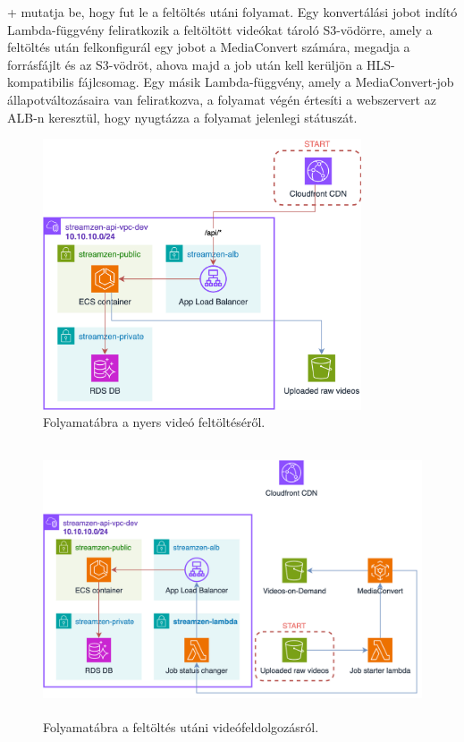 \Az+ mutatja be, hogy fut le a feltöltés utáni folyamat. Egy konvertálási jobot indító Lambda-függvény feliratkozik a feltöltött videókat tároló S3-vödörre, amely a feltöltés után felkonfigurál egy jobot a MediaConvert számára, megadja a forrásfájlt és az S3-vödröt, ahova majd a job után kell kerüljön a HLS-kompatibilis fájlcsomag. Egy másik Lambda-függvény, amely a MediaConvert-job állapotváltozásaira van feliratkozva, a folyamat végén értesíti a webszervert az ALB-n keresztül, hogy nyugtázza a folyamat jelenlegi státuszát.

\begin{figure}[h]
	\centering
	\includegraphics[height=80mm, keepaspectratio]{figures/dipterv_vod1.png}
	\caption{Folyamatábra a nyers videó feltöltéséről.}
	\label{fig:vod1}
\end{figure}

\begin{figure}[h]
	\centering
	\includegraphics[height=80mm, keepaspectratio]{figures/dipterv_vod2.png}
	\caption{Folyamatábra a feltöltés utáni videófeldolgozásról.}
	\label{fig:vod2}
\end{figure}

